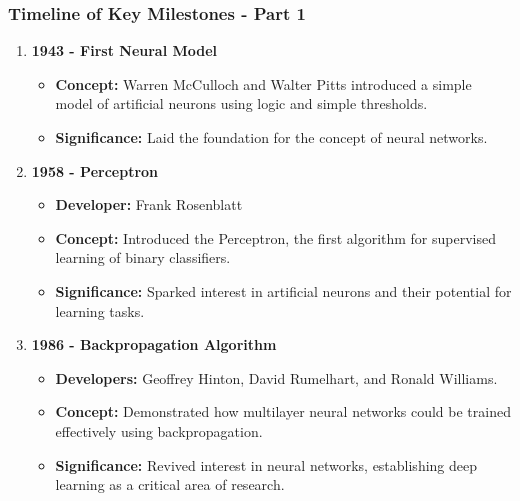 \documentclass[aspectratio=169]{beamer}
\begin{document}
\begin{frame}[fragile]
    \frametitle{Timeline of Key Milestones - Part 1}
    \begin{enumerate}
        \item \textbf{1943 - First Neural Model}
        \begin{itemize}
            \item \textbf{Concept:} Warren McCulloch and Walter Pitts introduced a simple model of artificial neurons using logic and simple thresholds.
            \item \textbf{Significance:} Laid the foundation for the concept of neural networks.
        \end{itemize}

        \item \textbf{1958 - Perceptron}
        \begin{itemize}
            \item \textbf{Developer:} Frank Rosenblatt
            \item \textbf{Concept:} Introduced the Perceptron, the first algorithm for supervised learning of binary classifiers.
            \item \textbf{Significance:} Sparked interest in artificial neurons and their potential for learning tasks.
        \end{itemize}

        \item \textbf{1986 - Backpropagation Algorithm}
        \begin{itemize}
            \item \textbf{Developers:} Geoffrey Hinton, David Rumelhart, and Ronald Williams.
            \item \textbf{Concept:} Demonstrated how multilayer neural networks could be trained effectively using backpropagation.
            \item \textbf{Significance:} Revived interest in neural networks, establishing deep learning as a critical area of research.
        \end{itemize}
    \end{enumerate}
\end{frame}
\end{document}
